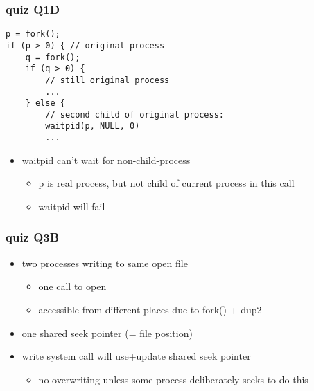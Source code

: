 \begin{FragileFrame}
\frametitle{quiz Q1D}
\begin{Verbatim}[fontsize=\fontsize{10}{11}]
p = fork();
if (p > 0) { // original process
    q = fork();
    if (q > 0) {
        // still original process
        ...
    } else {
        // second child of original process:
        waitpid(p, NULL, 0)
        ...
\end{Verbatim}
\begin{itemize}
\item waitpid can't wait for non-child-process
    \begin{itemize}
    \item p is real process, but not child of current process in this call
    \item waitpid will fail
    \end{itemize}
\end{itemize}
\end{FragileFrame}

\begin{FragileFrame}
\frametitle{quiz Q3B}
\begin{itemize}
\item two processes writing to same open file
    \begin{itemize}
    \item one call to open
    \item accessible from different places due to fork() + dup2
    \end{itemize}
\item one shared seek pointer (= file position)
\item write system call will use+update shared seek pointer
    \begin{itemize}
    \item no overwriting unless some process deliberately seeks to do this
    \end{itemize}
\end{itemize}
\end{FragileFrame}
